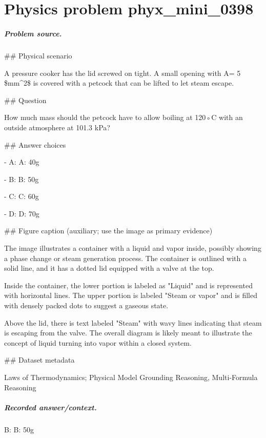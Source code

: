 
\chapter{Physics problem phyx\_mini\_0398}
\label{ch:PhyXMiniProblems_problem_phyx_mini_0398}

\paragraph{Problem source.}
\#\# Physical scenario

A pressure cooker has the lid screwed on tight. A small opening with A= 5 \$mm\textasciicircum{}2\$ is covered with a petcock that can be lifted to let steam escape.

\#\# Question

How much mass should the petcock have to allow boiling at 120◦C with an outside atmosphere at 101.3 kPa?

\#\# Answer choices

- A: A: 40g

- B: B: 50g

- C: C: 60g

- D: D: 70g

\#\# Figure caption (auxiliary; use the image as primary evidence)

The image illustrates a container with a liquid and vapor inside, possibly showing a phase change or steam generation process. The container is outlined with a solid line, and it has a dotted lid equipped with a valve at the top. 

Inside the container, the lower portion is labeled as "Liquid" and is represented with horizontal lines. The upper portion is labeled "Steam or vapor" and is filled with densely packed dots to suggest a gaseous state.

Above the lid, there is text labeled "Steam" with wavy lines indicating that steam is escaping from the valve. The overall diagram is likely meant to illustrate the concept of liquid turning into vapor within a closed system.

\#\# Dataset metadata

Laws of Thermodynamics; Physical Model Grounding Reasoning, Multi-Formula Reasoning

\paragraph{Recorded answer/context.}
B: B: 50g

